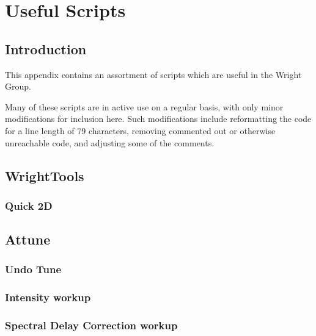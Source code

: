 \chapter{Useful Scripts} \label{cha:scripts}

\clearpage

\section{Introduction}  

This appendix contains an assortment of scripts which are useful in the Wright Group.

Many of these scripts are in active use on a regular basis, with only minor modifications for inclusion here.
Such modifications include reformatting the code for a line length of 79 characters, removing commented out or otherwise unreachable code, and adjusting some of the comments.

\clearpage

\section{WrightTools}  

\subsection{Quick 2D}

\clearpage

\section{Attune}  

\subsection{Undo Tune}
\clearpage

\subsection{Intensity workup}
\clearpage

\subsection{Spectral Delay Correction workup}
\clearpage

